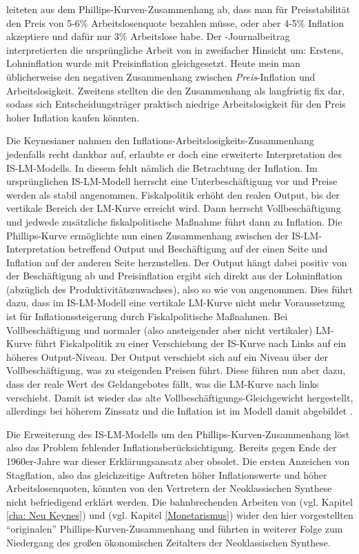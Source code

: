 \textcite[S. 192]{Samuelson1960} leiteten aus dem Phillips-Kurven-Zusammenhang ab, dass man für Preisstabilität den Preis von 5-6\% Arbeitslosenquote bezahlen müsse, oder aber 4-5\% Inflation akzeptiere und dafür nur 3\% Arbeitslose habe. Der \textcite{Samuelson1960}-Journalbeitrag interpretierten die ursprüngliche Arbeit von \textcite{Phillips1958} in zweifacher Hinsicht um: Erstens, Lohninflation wurde mit Preisinflation gleichgesetzt. Heute mein man üblicherweise den negativen Zusammenhang zwischen \textit{Preis}-Inflation und Arbeitslosigkeit. Zweitens stellten die \textcite{Samuelson1960} den Zusammenhang als langfristig fix dar, sodass sich Entscheidungsträger praktisch niedrige Arbeitslosigkeit für den Preis hoher Inflation kaufen könnten.

Die Keynesianer nahmen den Inflations-Arbeitslosigkeits-Zusammenhang jedenfalls recht dankbar auf, erlaubte er doch eine erweiterte Interpretation des IS-LM-Modells. In diesem fehlt nämlich die Betrachtung der Inflation. Im ursprünglichen IS-LM-Modell herrscht eine Unterbeschäftigung vor und Preise werden als stabil angenommen. Fiskalpolitik erhöht den realen Output, bis der vertikale Bereich der LM-Kurve erreicht wird. Dann herrscht Vollbeschäftigung und jedwede zusätzliche fiskalpolitische Maßnahme führt dann zu Inflation. Die Phillips-Kurve ermöglichte nun einen Zusammenhang zwischen der IS-LM-Interpretation betreffend Output und Beschäftigung auf der einen Seite und Inflation auf der anderen Seite herzustellen. Der Output hängt dabei positiv von der Beschäftigung ab und Preisinflation ergibt sich direkt aus der Lohninflation (abzüglich des Produktivitätszuwachses), also so wie von \textcite{Samuelson1960} angenommen. Dies führt dazu, dass im IS-LM-Modell eine vertikale LM-Kurve nicht mehr Voraussetzung ist für Inflationssteigerung durch Fiskalpolitische Maßnahmen. Bei Vollbeschäftigung und normaler (also ansteigender aber nicht vertikaler) LM-Kurve führt Fiskalpolitik zu einer Verschiebung der IS-Kurve nach Links auf ein höheres Output-Niveau. Der Output verschiebt sich auf ein Niveau über der Vollbeschäftigung, was zu steigenden Preisen führt. Diese führen nun aber dazu, dass der reale Wert des Geldangebotes fällt, was die LM-Kurve nach links verschiebt. Damit ist wieder das alte Vollbeschäftigungs-Gleichgewicht hergestellt, allerdings bei höherem Zinssatz und die Inflation ist im Modell damit abgebildet \parencite[S. 143f]{Snowdon2005}.

Die Erweiterung des IS-LM-Modells um den Phillips-Kurven-Zusammenhang löst also das Problem fehlender Inflationsberücksichtigung. Bereits gegen Ende der 1960er-Jahre war dieser Erklärungsansatz aber obsolet. Die ersten Anzeichen von Stagflation, also das gleichzeitige Auftreten höher Inflationswerte und höher Arbeitslosenquoten, könnten von den Vertretern der Neoklassischen Synthese nicht befriedigend erklärt werden. Die bahnbrechenden Arbeiten von \textcite{Phelps1968} (vgl. Kapitel \ref{cha: Neu Keynes}) und \textcite{Friedman1968} (vgl. Kapitel \ref{Monetarismus}) wider den hier vorgestellten "`originalen"' Phillips-Kurven-Zusammenhang und führten in weiterer Folge zum Niedergang des großen ökonomischen Zeitalters der Neoklassischen Synthese.

